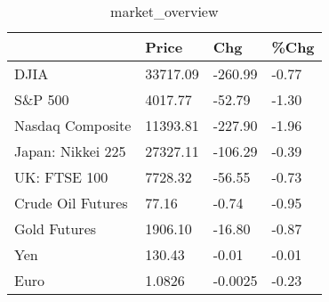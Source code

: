 \documentclass{article}%
\begin{document}
%


\begin{table}[htbp]%
\caption{market\_overview}%
\centering%
\begin{adjustbox}{width=1\textwidth}%
\begin{tabular}{llll}
\toprule
                  &    Price &     Chg &  \%Chg \\
\midrule
             DJIA & 33717.09 & -260.99 & -0.77 \\
          S\&P 500 &  4017.77 &  -52.79 & -1.30 \\
 Nasdaq Composite & 11393.81 & -227.90 & -1.96 \\
Japan: Nikkei 225 & 27327.11 & -106.29 & -0.39 \\
     UK: FTSE 100 &  7728.32 &  -56.55 & -0.73 \\
Crude Oil Futures &    77.16 &   -0.74 & -0.95 \\
     Gold Futures &  1906.10 &  -16.80 & -0.87 \\
              Yen &   130.43 &   -0.01 & -0.01 \\
             Euro &   1.0826 & -0.0025 & -0.23 \\
\bottomrule
\end{tabular}
%
\end{adjustbox}%
\end{table}

%
\end{document}
